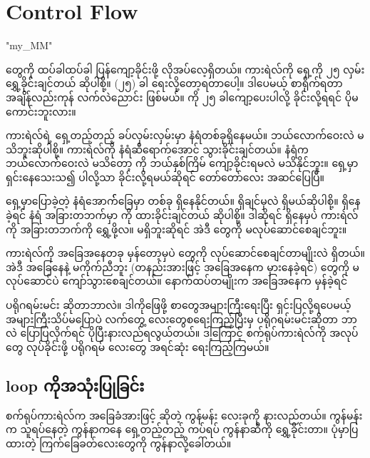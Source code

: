 \chapter{Control Flow}
\XeTeXlinebreaklocale "my_MM"  %
\begin{sloppypar}

\mmcommand တွေကို ထပ်ခါထပ်ခါ ပြန်ကျော့ခိုင်းဖို့ လိုအပ်လေ့ရှိတယ်။ ကားရဲလ်ကို ရှေ့ကို ၂၅ လှမ်း ရွှေ့ခိုင်းချင်တယ် ဆိုပါစို့။  (၂၅) ခါ ရေးလို့‌တော့ရတာပေါ့။ ဒါပေမယ့် စာရိုက်ရတာ အချိန်လည်းကုန် လက်လဲညောင်း ဖြစ်မယ်။  ကို ၂၅ ခါကျော့ပေးပါလို့ ခိုင်းလို့ရရင် ပိုမကောင်းဘူးလား။ 

ကားရဲလ်ရဲ့ ရှေ့တည့်တည့် ခပ်လှမ်းလှမ်းမှာ နံရံတစ်ခုရှိနေမယ်။ ဘယ်လောက်ဝေးလဲ မသိဘူးဆိုပါစို့။ ကားရဲလ်ကို နံရံဆီရောက်အောင် သွားခိုင်းချင်တယ်။ နံရံက ဘယ်လောက်ဝေးလဲ မသိတော့  ကို ဘယ်နှစ်ကြိမ် ကျော့ခိုင်းရမလဲ မသိနိုင်ဘူး။ ရှေ့မှာရှင်းနေသေးသ၍  ပါလို့သာ ခိုင်းလို့ရမယ်ဆိုရင် တော်တော်လေး အဆင်ပြေပြီ။ 

ရှေ့မှာပြောခဲ့တဲ့ နံရံအောက််ခြေမှာ \mmbeeper တစ်ခု ရှိနေနိုင်တယ်။ ရှိချင်မှလဲ ရှိမယ်ဆိုပါစို့။ \mmbeeper ရှိနေခဲ့ရင် နံရံ အခြားတဘက်မှာ \mmbeeper ကို ထားခိုင်းချင်တယ် ဆိုပါစို့။  ဒါဆိုရင် \mmbeeper ရှိနေမှပဲ ကားရဲလ်ကို အခြားတဘက်ကို ရွှေ့ဖို့လ။ \mmbeeper မရှိဘူးဆိုရင် အဲဒီ \mmcommand တွေကို မလုပ်ဆောင်စေချင်ဘူး။  

ကားရဲလ်ကို အခြေအနေတခု မှန်တော့မှပဲ \mmcommand တွေကို လုပ်ဆောင်စေချင်တာမျိုးလဲ ရှိတယ်။ အဲဒီ အခြေနေနဲ့ မကိုက်ညီဘူး (တနည်းအားဖြင့် အခြေအနေက မှားနေခဲ့ရင်) \mmcommand တွေကို မလုပ်ဆောင်ပဲ ကျော်သွားစေချင်တယ်။ နောက်ထပ်တမျိုးက အခြေအနေက မှန်ခဲ့ရင် 




ပရိုဂရမ်းမင်း ဆိုတာဘာလဲ။ ဒါကိုဖြေဖို့ စာတွေအများကြီးရေးပြီး ရှင်းပြလို့ရပေမယ့် အများကြီးသိပ်မပြောပဲ လက်တွေ့  လေးတွေစရေးကြည့်ပြီးမှ ပရိုဂရမ်းမင်းဆိုတာ ဘာလဲ ပြောပြလိုက်ရင် ပိုပြီးနားလည်ရလွယ်တယ်။ ဒါ့ကြောင့် စက်ရုပ်ကားရဲလ်ကို အလုပ်တွေ လုပ်ခိုင်းဖို့ ပရိုဂရမ် လေးတွေ အရင်ဆုံး ရေးကြည့်ကြမယ်။
\section{{} loop ကိုအသုံးပြုခြင်း}
စက်ရုပ်ကားရဲလ်က အခြေခံအားဖြင့်  ဆိုတဲ့ ကွန်မန်း လေးခုကို နားလည်တယ်။  ကွန်မန်းက သူရပ်နေတဲ့ ကွန်နာကနေ ရှေ့တည့်တည့် ကပ်ရပ် ကွန်နာဆီကို ရွှေ့ခိုင်းတာ။ ပုံမှာပြထားတဲ့ ကြက်ခြေခတ်လေးတွေကို ကွန်နာလို့ခေါ်တယ်။ 


\end{sloppypar}
